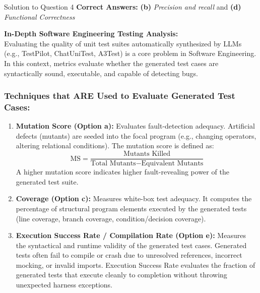 \documentclass[11pt,a4paper]{article}
\begin{document}
\begin{solutionbox}{Solution to Question 4}
\textbf{Correct Answers:} \textbf{(b)} \textit{Precision and recall} \quad and \quad \textbf{(d)} \textit{Functional Correctness}

\medskip
\textbf{In-Depth Software Engineering Testing Analysis:}\\
Evaluating the quality of unit test suites automatically synthesized by LLMs (e.g., TestPilot, ChatUniTest, A3Test) is a core problem in Software Engineering. In this context, metrics evaluate whether the generated test cases are syntactically sound, executable, and capable of detecting bugs.

\subsubsection*{Techniques that ARE Used to Evaluate Generated Test Cases:}
\begin{enumerate}[label=\textbf{\arabic*.}]
    \item \textbf{Mutation Score (Option a):} Evaluates fault-detection adequacy. Artificial defects (mutants) are seeded into the focal program (e.g., changing operators, altering relational conditions). The mutation score is defined as:
    \begin{equation*}
    \text{MS} = \frac{\text{Mutants Killed}}{\text{Total Mutants} - \text{Equivalent Mutants}}
    \end{equation*}
    A higher mutation score indicates higher fault-revealing power of the generated test suite.
    \item \textbf{Coverage (Option c):} Measures white-box test adequacy. It computes the percentage of structural program elements executed by the generated tests (line coverage, branch coverage, condition/decision coverage).
    \item \textbf{Execution Success Rate / Compilation Rate (Option e):} Measures the syntactical and runtime validity of the generated test cases. Generated tests often fail to compile or crash due to unresolved references, incorrect mocking, or invalid imports. Execution Success Rate evaluates the fraction of generated tests that execute cleanly to completion without throwing unexpected harness exceptions.
\end{enumerate}


\end{solutionbox}
\end{document}
